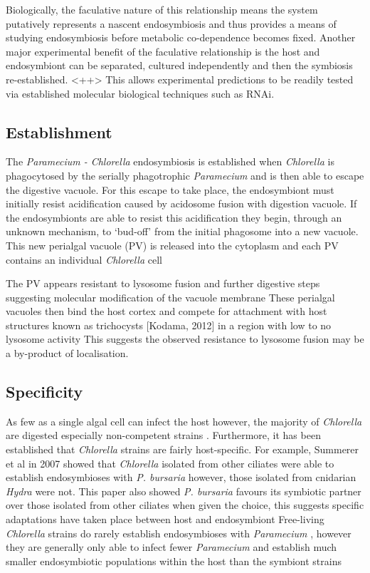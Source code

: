 Biologically, the faculative nature of this relationship means the system putatively represents a nascent endosymbiosis and thus provides a means of studying endosymbiosis before metabolic co-dependence becomes fixed. 
Another major experimental benefit of the faculative relationship is the host and endosymbiont can be separated, cultured independently and then the symbiosis re-established.  <++>
This allows experimental predictions to be readily tested via established molecular biological techniques such as RNAi.


\subsection{Establishment}
The \textit{Paramecium - Chlorella} endosymbiosis is established when \textit{Chlorella} is phagocytosed by the serially phagotrophic \textit{Paramecium} and is then able to escape the digestive vacuole.  
For this escape to take place, the endosymbiont must initially resist acidification caused by acidosome fusion with digestion vacuole.  
If the endosymbionts are able to resist this acidification they begin, through an unknown mechanism, to `bud-off' from the initial phagosome into a new vacuole.  
This new perialgal vacuole (PV) is released into the cytoplasm and each PV contains an individual \textit{Chlorella} cell \citep{Kodama2009}

The PV appears resistant to lysosome fusion and further digestive steps suggesting molecular modification of the vacuole membrane \citep{Johnson2011}
These perialgal vacuoles then bind the host cortex and compete for attachment with host structures known as trichocysts [Kodama, 2012] in a region with low to no lysosome activity \citep{Kodama2009}
This suggests the observed resistance to lysosome fusion may be a by-product of localisation. 




\subsection{Specificity}
As few as a single algal cell can infect the host \citep{Weiss1976} however, the majority of \textit{Chlorella} are digested especially non-competent strains \citep{Kodama2007}. 
Furthermore, it has been established that \textit{Chlorella} strains are fairly host-specific.  
For example, Summerer et al in 2007 \citep{Summerer2007} showed that \textit{Chlorella} isolated from other ciliates were able to establish endosymbioses with \textit{P. bursaria} however, those isolated from cnidarian \textit{Hydra} were not.  
This paper also showed \textit{P. bursaria} favours its symbiotic partner over those isolated from other ciliates when given the choice, this suggests specific adaptations have taken place between host and endosymbiont \citep{Summerer2007}
Free-living \textit{Chlorella} strains do rarely establish endosymbioses with \textit{Paramecium} \citep{Karakashian1959}, however they are generally only able to infect fewer \textit{Paramecium} and establish much smaller endosymbiotic populations within the host than the symbiont strains \citep{Karakashian1959}


